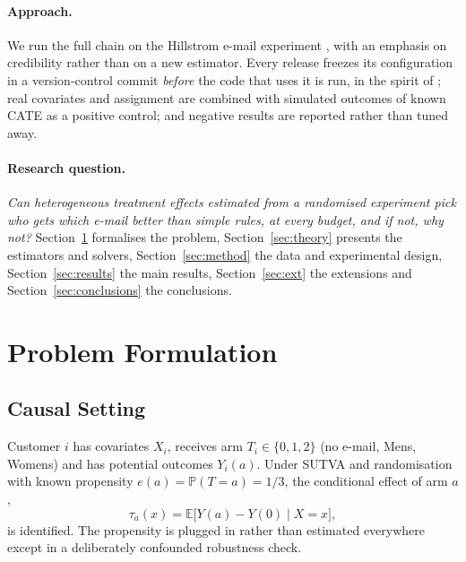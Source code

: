 \documentclass[10pt,twocolumn]{article}
\newcommand{\E}{\mathbb{E}}
\newcommand{\Prob}{\mathbb{P}}
\begin{document}
\paragraph{Approach.}
We run the full chain on the Hillstrom e-mail experiment \citep{hillstrom2008}, with an
emphasis on credibility rather than on a new estimator. Every release freezes its configuration in a
version-control commit \emph{before} the code that uses it is run, in the spirit of
\citet{nosek2018}; real covariates and assignment are combined with simulated outcomes of known CATE
as a positive control; and negative results are reported rather than tuned away.

\paragraph{Research question.}
\emph{Can heterogeneous treatment effects estimated from a randomised experiment pick who gets which
e-mail better than simple rules, at every budget, and if not, why not?} Section~\ref{sec:problem}
formalises the problem, Section~\ref{sec:theory} presents the estimators and solvers,
Section~\ref{sec:method} the data and experimental design, Section~\ref{sec:results} the main results, Section~\ref{sec:ext} the extensions and
Section~\ref{sec:conclusions} the conclusions.

\section{Problem Formulation}
\label{sec:problem}

\subsection{Causal Setting}
Customer $i$ has covariates $X_i$, receives arm $T_i\in\{0,1,2\}$ (no e-mail, Mens, Womens) and has
potential outcomes $Y_i(a)$. Under SUTVA and randomisation with known propensity
$e(a)=\Prob(T=a)=1/3$, the conditional effect of arm $a$,
\begin{equation}
  \tau_a(x) = \E\big[Y(a)-Y(0)\mid X=x\big],
\end{equation}
is identified. The propensity is plugged in rather than estimated everywhere except in a
deliberately confounded robustness check.
\end{document}
